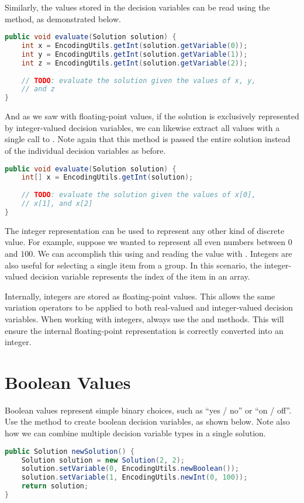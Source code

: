 Similarly, the values stored in the decision variables can be read using the  method, as demonstrated below.
\begin{lstlisting}[language=Java]
public void evaluate(Solution solution) {
    int x = EncodingUtils.getInt(solution.getVariable(0));
    int y = EncodingUtils.getInt(solution.getVariable(1));
    int z = EncodingUtils.getInt(solution.getVariable(2));
    
    // TODO: evaluate the solution given the values of x, y,
    // and z
}
\end{lstlisting}

And as we saw with floating-point values, if the solution is exclusively represented by integer-valued decision variables, we can likewise extract all values with a single call to .  Note again that this method is passed the entire solution instead of the individual decision variables as before.
\begin{lstlisting}[language=Java]
public void evaluate(Solution solution) {
    int[] x = EncodingUtils.getInt(solution);
        
    // TODO: evaluate the solution given the values of x[0],
    // x[1], and x[2]
}
\end{lstlisting}

The integer representation can be used to represent any other kind of discrete value.  For example, suppose we wanted to represent all even numbers between $0$ and $100$.  We can accomplish this using  and reading the value with .  Integers are also useful for selecting a single item from a group.  In this scenario, the integer-valued decision variable represents the index of the item in an array.

\begin{tip}
Internally, integers are stored as floating-point values.  This allows the same variation operators to be applied to both real-valued and integer-valued decision variables.  When working with integers, always use the  and  methods.  This will ensure the internal floating-point representation is correctly converted into an integer.
\end{tip}

\section{Boolean Values}
Boolean values represent simple binary choices, such as ``yes / no'' or ``on / off''.  Use the  method to create boolean decision variables, as shown below.  Note also how we can combine multiple decision variable types in a single solution.
\begin{lstlisting}[language=Java]
public Solution newSolution() {
    Solution solution = new Solution(2, 2);
    solution.setVariable(0, EncodingUtils.newBoolean());
    solution.setVariable(1, EncodingUtils.newInt(0, 100));
    return solution;
}
\end{lstlisting}

